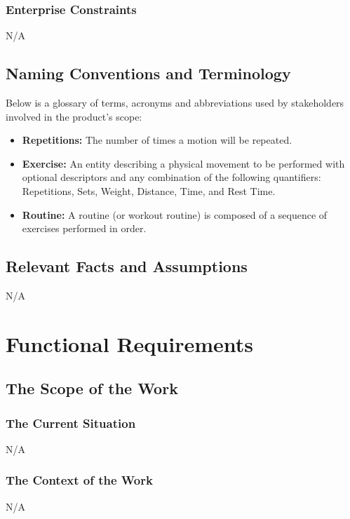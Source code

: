 \documentclass[12pt]{article}
\begin{document}
\subsubsection{Enterprise Constraints}
N/A

\subsection{Naming Conventions and Terminology}
Below is a glossary of terms, acronyms and abbreviations used by stakeholders involved in the product's scope:
\begin{itemize}
	\item \textbf{Repetitions: } The number of times a motion will be repeated.
	\item \textbf{Exercise: } An entity describing a physical movement to be performed with optional descriptors and any combination of the following quantifiers: Repetitions, Sets, Weight, Distance, Time, and Rest Time. 
	\item \textbf{Routine: } A routine (or workout routine) is composed of a sequence of exercises performed in order.
\end{itemize}
\subsection{Relevant Facts and Assumptions}
N/A
\section{Functional Requirements}
\subsection{The Scope of the Work}
\subsubsection{The Current Situation}
N/A
\subsubsection{The Context of the Work}
N/A
\end{document}
